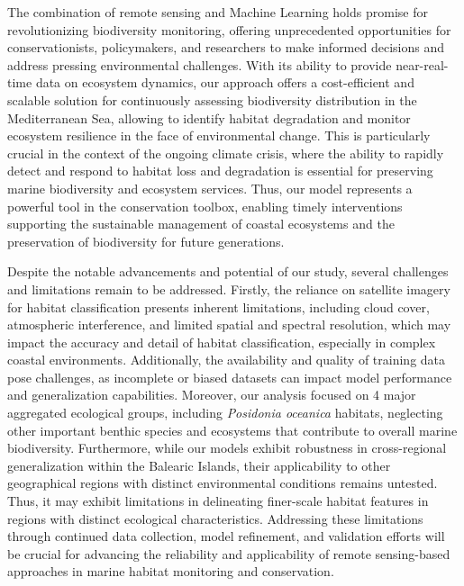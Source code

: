 The combination of remote sensing and Machine Learning holds promise for
revolutionizing biodiversity monitoring, offering unprecedented opportunities
for conservationists, policymakers, and researchers to make informed decisions
and address pressing environmental challenges. With its ability to provide
near-real-time data on ecosystem dynamics, our approach offers a cost-efficient
and scalable solution for continuously assessing biodiversity distribution in
the Mediterranean Sea, allowing to identify habitat degradation and monitor
ecosystem resilience in the face of environmental change. This is particularly
crucial in the context of the ongoing climate crisis, where the ability to
rapidly detect and respond to habitat loss and degradation is essential for
preserving marine biodiversity and ecosystem services. Thus, our model
represents a powerful tool in the conservation toolbox, enabling timely
interventions supporting the sustainable management of coastal ecosystems and
the preservation of biodiversity for future generations.

Despite the notable advancements and potential of our study, several challenges
and limitations remain to be addressed. Firstly, the reliance on satellite
imagery for habitat classification presents inherent limitations, including
cloud cover, atmospheric interference, and limited spatial and spectral
resolution, which may impact the accuracy and detail of habitat classification,
especially in complex coastal environments. Additionally, the availability and
quality of training data pose challenges, as incomplete or biased datasets can
impact model performance and generalization capabilities. Moreover, our
analysis focused on 4 major aggregated ecological groups, including
\textit{Posidonia oceanica} habitats, neglecting other important benthic
species and ecosystems that contribute to overall marine biodiversity.
Furthermore, while our models exhibit robustness in cross-regional
generalization within the Balearic Islands, their applicability to other
geographical regions with distinct environmental conditions remains untested.
Thus, it may exhibit limitations in delineating finer-scale habitat features in
regions with distinct ecological characteristics. Addressing these limitations
through continued data collection, model refinement, and validation efforts
will be crucial for advancing the reliability and applicability of remote
sensing-based approaches in marine habitat monitoring and conservation.

